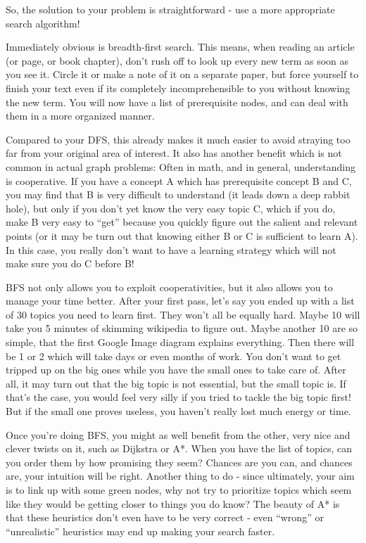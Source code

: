 So, the solution to your problem is straightforward - use a more appropriate
search algorithm!

Immediately obvious is breadth-first search. This means, when reading an
article (or page, or book chapter), don't rush off to look up every new term
as soon as you see it. Circle it or make a note of it on a separate paper, but
force yourself to finish your text even if its completely incomprehensible to
you without knowing the new term. You will now have a list of prerequisite
nodes, and can deal with them in a more organized manner.

Compared to your DFS, this already makes it much easier to avoid straying too
far from your original area of interest. It also has another benefit which is
not common in actual graph problems: Often in math, and in general,
understanding is cooperative. If you have a concept A which has prerequisite
concept B and C, you may find that B is very difficult to understand (it leads
down a deep rabbit hole), but only if you don't yet know the very easy topic
C, which if you do, make B very easy to ``get'' because you quickly figure out
the salient and relevant points (or it may be turn out that knowing either B
or C is sufficient to learn A). In this case, you really don't want to have a
learning strategy which will not make sure you do C before B!

BFS not only allows you to exploit cooperativities, but it also allows you to
manage your time better. After your first pass, let's say you ended up with a
list of 30 topics you need to learn first. They won't all be equally hard.
Maybe 10 will take you 5 minutes of skimming wikipedia to figure out. Maybe
another 10 are so simple, that the first Google Image diagram explains
everything. Then there will be 1 or 2 which will take days or even months of
work. You don't want to get tripped up on the big ones while you have the
small ones to take care of. After all, it may turn out that the big topic is
not essential, but the small topic is. If that's the case, you would feel very
silly if you tried to tackle the big topic first! But if the small one proves
useless, you haven't really lost much energy or time.

Once you're doing BFS, you might as well benefit from the other, very nice and
clever twists on it, such as Dijkstra or A*. When you have the list of topics,
can you order them by how promising they seem? Chances are you can, and
chances are, your intuition will be right. Another thing to do - since
ultimately, your aim is to link up with some green nodes, why not try to
prioritize topics which seem like they would be getting closer to things you
do know? The beauty of A* is that these heuristics don't even have to be very
correct - even ``wrong'' or ``unrealistic'' heuristics may end up making your
search faster.
